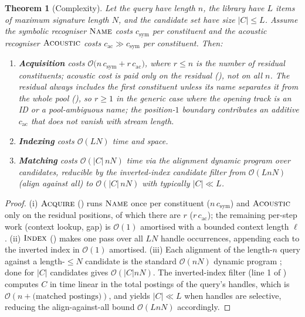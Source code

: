 \documentclass[11pt,twocolumn,a4paper]{article}
\theoremstyle{thmstyle}
\newtheorem{theorem}{Theorem}[section]
\theoremstyle{definition}
\theoremstyle{remark}
\newcommand{\abs}[1]{\lvert#1\rvert}
\newcommand{\bigOh}{\mathcal{O}}
\begin{document}
\begin{theorem}[Complexity]
\label{thm:complexity}
Let the query have length $n$, the library have $L$ items of maximum signature
length $N$, and the candidate set have size $\abs{C}\le L$. Assume the symbolic
recogniser $\textsc{Name}$ costs $c_{\mathrm{sym}}$ per constituent and the
acoustic recogniser $\textsc{Acoustic}$ costs $c_{\mathrm{ac}}\gg c_{\mathrm{sym}}$
per constituent. Then:
\begin{enumerate}[label=\textup{(\roman*)},leftmargin=2.2em]
\item \textbf{Acquisition} costs
$\bigOh\!\bigl(n\,c_{\mathrm{sym}} + r\,c_{\mathrm{ac}}\bigr)$, where $r\le n$ is
the number of residual constituents; acoustic cost is paid only on the residual
(), not on all $n$. The residual always includes the first
constituent unless its name separates it from the whole pool
(), so $r\ge 1$ in the generic case where the opening track is
an ID or a pool-ambiguous name; the position-$1$ boundary contributes an additive
$c_{\mathrm{ac}}$ that does not vanish with stream length.
\item \textbf{Indexing} costs $\bigOh(LN)$ time and space.
\item \textbf{Matching} costs $\bigOh(\abs{C}\,nN)$ time via the alignment
dynamic program over candidates, reducible by the inverted-index candidate filter
from $\bigOh(LnN)$ (align against all) to $\bigOh(\abs{C}\,nN)$ with typically
$\abs{C}\ll L$.
\end{enumerate}
\end{theorem}

\begin{proof}
(i) $\textsc{Acquire}$ () runs $\textsc{Name}$ once per
constituent ($n\,c_{\mathrm{sym}}$) and $\textsc{Acoustic}$ only on the residual
positions, of which there are $r$ ($r\,c_{\mathrm{ac}}$); the remaining per-step
work (context lookup, gap) is $\bigOh(1)$ amortised with a bounded context length
$\ell$. (ii) $\textsc{Index}$ () makes one pass over all $LN$
handle occurrences, appending each to the inverted index in $\bigOh(1)$
amortised. (iii) Each alignment of the length-$n$ query against a length-$\le N$
candidate is the standard $\bigOh(nN)$ dynamic program
\citep{needleman1970,smith1981,cormen2009}; done for $\abs{C}$ candidates gives
$\bigOh(\abs{C}nN)$. The inverted-index filter (line 1 of )
computes $C$ in time linear in the total postings of the query's handles, which
is $\bigOh(n + \text{(matched postings)})$, and yields $\abs{C}\ll L$ when
handles are selective, reducing the align-against-all bound $\bigOh(LnN)$
accordingly.
\end{proof}
\end{document}

